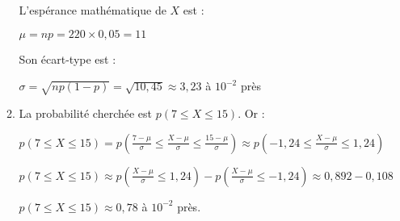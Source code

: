 \begin{corrige}
\begin{enumerate}
\begin{enumerate}[label=\alph*.]
               \par
               L'espérance mathématique de $X$ est :
               \par
               $\mu =np=220\times 0,05=11$
               \par
               Son écart-type est :
               \par
               $\sigma =\sqrt{np\left(1-p\right)}=\sqrt{10,45}\approx 3,23$ à $10^{-2}$ près
               \item
               La probabilité cherchée est $p\left(7\leqslant X\leqslant 15\right)$. Or :
               \par
               $p\left(7\leqslant X\leqslant 15\right)=p\left(\frac{7-\mu }{\sigma }\leqslant \frac{X-\mu }{\sigma }\leqslant \frac{15-\mu }{\sigma }\right)\approx p\left(-1,24\leqslant \frac{X-\mu }{\sigma }\leqslant 1,24\right) $
               \par
               $p\left(7\leqslant X\leqslant 15\right)\approx p\left(\frac{X-\mu }{\sigma }\leqslant 1,24\right)-p\left(\frac{X-\mu }{\sigma }\leqslant -1,24\right)\approx  0,892-0,108$
               \par
               $p\left(7\leqslant X\leqslant 15\right)\approx 0,78$ à $10^{-2}$ près.
          \end{enumerate}
     \end{enumerate}
\end{corrige}
